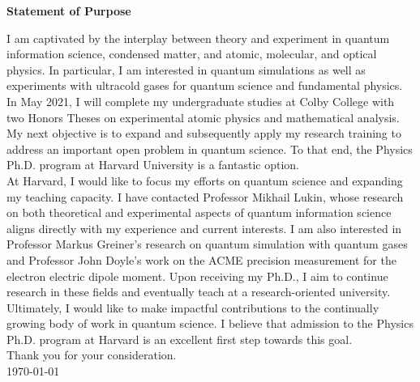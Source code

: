 \documentclass[12pt]{article}
\begin{document}
\begin{center}
	\textbf{Statement of Purpose}
\end{center}
I am captivated by the interplay between theory and experiment in quantum information science, condensed matter, and atomic, molecular, and optical physics. In particular, I am interested in  quantum simulations as well as experiments with ultracold gases for quantum science and fundamental physics. In May 2021, I will complete my undergraduate studies at Colby College with two Honors Theses on experimental atomic physics and mathematical analysis. My next objective is to expand and subsequently apply my research training to address an important open problem in quantum science. To that end, the Physics Ph.D. program at Harvard University is a fantastic option.  \\ 

 


At Harvard, I would like to focus my efforts on quantum science and expanding my teaching capacity. I have contacted Professor Mikhail Lukin, whose research on both theoretical and experimental aspects of quantum information science aligns directly with my experience and current interests. I am also interested in Professor Markus Greiner's research on quantum simulation with quantum gases and Professor John Doyle's work on the ACME precision measurement for the electron electric dipole moment. Upon receiving my Ph.D., I aim to continue research in these fields and eventually teach at a research-oriented university. Ultimately, I would like to make impactful contributions to the continually growing body of work in quantum science. I believe that admission to the Physics Ph.D. program at Harvard is an excellent first step towards this goal. \\


\noindent Thank you for your consideration. \\

\noindent \today
	











	
	
	
	
	
\end{document}
